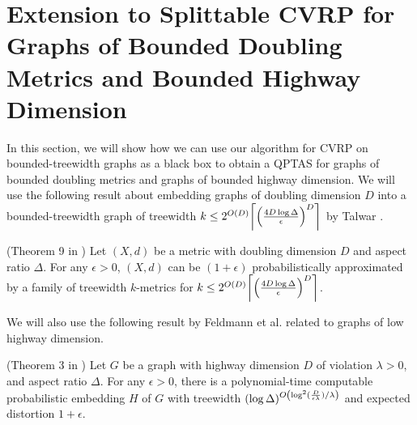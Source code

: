 \documentclass[twoside,leqno]{article}
\newcommand{\eps}{\epsilon}
\DeclarePairedDelimiter\ceil{\lceil}{\rceil}
\DeclarePairedDelimiter\autobracket{(}{)}
\newcommand{\br}[1]{\autobracket*{#1}}
\begin{document}
\section{Extension to Splittable CVRP for Graphs of Bounded Doubling Metrics and Bounded Highway Dimension}
In this section, we will show how we can use our algorithm for CVRP on bounded-treewidth graphs as a black box to obtain a QPTAS for graphs of bounded doubling metrics and graphs of bounded highway dimension.  We will use the following result about embedding graphs of doubling dimension $D$ into a bounded-treewidth graph of treewidth $k \le 2^{O(D)}\ceil*{\br{\frac{4D\log \Delta}{\eps}}^D}$ by Talwar \cite{Talwar-embedding}.
\begin{lemma}\label{lem:doubling-embed}
(Theorem 9 in \cite{Talwar-embedding}) Let $(X,d)$ be a metric with doubling dimension $D$ and aspect ratio $\Delta$. For any $\eps > 0$, $(X,d)$ can be $(1 + \eps)$ probabilistically approximated by a family of treewidth $k$-metrics for $k \le 2^{O(D)}\ceil*{\br{\frac{4D\log \Delta}{\eps}}^D}$.
\end{lemma}
We will also use the following result by Feldmann et al. \cite{FeldmannFKP15-embedding} related to graphs of low highway dimension.
\begin{lemma}\label{lem:highway-embe}
(Theorem 3 in \cite{FeldmannFKP15-embedding}) Let $G$ be a graph with highway dimension $D$ of violation $\lambda > 0$, and aspect ratio $\Delta$. For any $\eps > 0$, there is a polynomial-time computable probabilistic embedding $H$ of $G$ with treewidth $(\log \Delta)^{O\br{\log^2(\frac{D}{\eps \lambda})/\lambda}}$ and expected distortion $1 + \eps$. \end{lemma}
\end{document}
